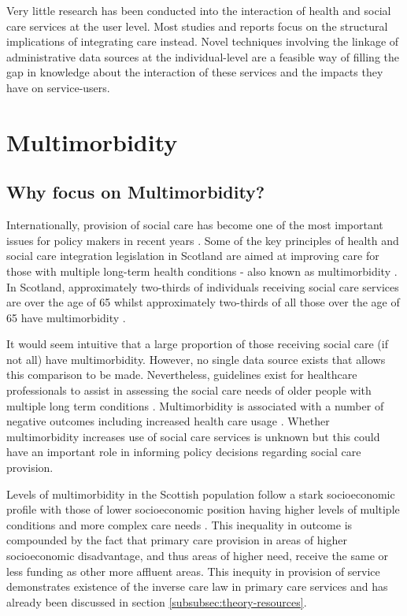 \documentclass[12pt,]{report}
\begin{document}
Very little research has been conducted into the interaction of health
and social care services at the user level. Most studies and reports
focus on the structural implications of integrating care instead. Novel
techniques involving the linkage of administrative data sources at the
individual-level are a feasible way of filling the gap in knowledge
about the interaction of these services and the impacts they have on
service-users.

\section{Multimorbidity}\label{sec:mm}

\subsection{Why focus on Multimorbidity?}\label{subsec:why-mm}

Internationally, provision of social care has become one of the most
important issues for policy makers in recent years \citep{RN406, RN250}.
Some of the key principles of health and social care integration
legislation in Scotland are aimed at improving care for those with
multiple long-term health conditions - also known as multimorbidity
\citep{RN266, RN251}. In Scotland, approximately two-thirds of
individuals receiving social care services are over the age of 65
\citep{RN128} whilst approximately two-thirds of all those over the age
of 65 have multimorbidity \citep{RN33}.

It would seem intuitive that a large proportion of those receiving
social care (if not all) have multimorbidity. However, no single data
source exists that allows this comparison to be made. Nevertheless,
guidelines exist for healthcare professionals to assist in assessing the
social care needs of older people with multiple long term conditions
\citep{RN150}. Multimorbidity is associated with a number of negative
outcomes including increased health care usage \citep{RN226}. Whether
multimorbidity increases use of social care services is unknown but this
could have an important role in informing policy decisions regarding
social care provision.

Levels of multimorbidity in the Scottish population follow a stark
socioeconomic profile with those of lower socioeconomic position having
higher levels of multiple conditions and more complex care needs
\citep{RN33, RN21}. This inequality in outcome is compounded by the fact
that primary care provision in areas of higher socioeconomic
disadvantage, and thus areas of higher need, receive the same or less
funding as other more affluent areas. This inequity in provision of
service demonstrates existence of the inverse care law in primary care
services \citep{RN120, RN39, RN148} and has already been discussed in
section \ref{subsubsec:theory-resources}.
\end{document}
